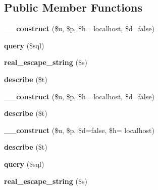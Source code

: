 \subsection*{Public Member Functions}
\begin{DoxyCompactItemize}
\item 
\hypertarget{classstore_ac6766462e1ba4cf747c89153c158e856}{}{\bfseries \+\_\+\+\_\+construct} (\$u, \$p, \$h= \textquotesingle{}localhost\textquotesingle{}, \$d=false)\label{classstore_ac6766462e1ba4cf747c89153c158e856}

\item 
\hypertarget{classstore_a65f535dfea7bcca33de5078d2bd8f18a}{}{\bfseries query} (\$sql)\label{classstore_a65f535dfea7bcca33de5078d2bd8f18a}

\item 
\hypertarget{classstore_a5ba951e504b410d9442d120e9492393c}{}{\bfseries real\+\_\+escape\+\_\+string} (\$s)\label{classstore_a5ba951e504b410d9442d120e9492393c}

\item 
\hypertarget{classstore_ac69e064cf1e0228d17a98c91d19bc627}{}{\bfseries describe} (\$t)\label{classstore_ac69e064cf1e0228d17a98c91d19bc627}

\item 
\hypertarget{classstore_ac6766462e1ba4cf747c89153c158e856}{}{\bfseries \+\_\+\+\_\+construct} (\$u, \$p, \$h= \textquotesingle{}localhost\textquotesingle{}, \$d=false)\label{classstore_ac6766462e1ba4cf747c89153c158e856}

\item 
\hypertarget{classstore_ac69e064cf1e0228d17a98c91d19bc627}{}{\bfseries describe} (\$t)\label{classstore_ac69e064cf1e0228d17a98c91d19bc627}

\item 
\hypertarget{classstore_a7e1de9852edc997e475aac1f1597730e}{}{\bfseries \+\_\+\+\_\+construct} (\$u, \$p, \$d=false, \$h= \textquotesingle{}localhost\textquotesingle{})\label{classstore_a7e1de9852edc997e475aac1f1597730e}

\item 
\hypertarget{classstore_ac69e064cf1e0228d17a98c91d19bc627}{}{\bfseries describe} (\$t)\label{classstore_ac69e064cf1e0228d17a98c91d19bc627}

\item 
\hypertarget{classstore_a65f535dfea7bcca33de5078d2bd8f18a}{}{\bfseries query} (\$sql)\label{classstore_a65f535dfea7bcca33de5078d2bd8f18a}

\item 
\hypertarget{classstore_a5ba951e504b410d9442d120e9492393c}{}{\bfseries real\+\_\+escape\+\_\+string} (\$s)\label{classstore_a5ba951e504b410d9442d120e9492393c}

\end{DoxyCompactItemize}
